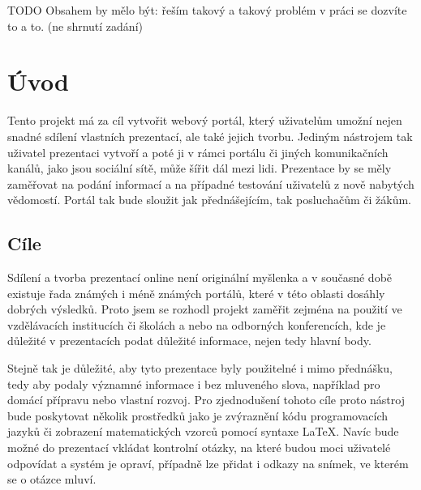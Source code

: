 \documentclass[11pt,twoside,a4paper]{book}
\begin{document}

	\baselineskip

	\noindent
	TODO Obsahem by mělo být: řeším takový a takový problém v práci se dozvíte to a to. (ne shrnutí zadání)

	\tableofcontents		%

	\listoffigures			%

	\mainbodystarts



\chapter{Úvod}
Tento projekt má za cíl vytvořit webový portál, který uživatelům umožní nejen snadné sdílení vlastních prezentací, ale také jejich tvorbu. Jediným nástrojem tak uživatel prezentaci vytvoří a poté ji v rámci portálu či jiných komunikačních kanálů, jako jsou sociální sítě, může šířit dál mezi lidi. Prezentace by se měly zaměřovat na podání informací a na případné testování uživatelů z nově nabytých vědomostí. Portál tak bude sloužit jak přednášejícím, tak posluchačům či žákům.

\section{Cíle}
Sdílení a tvorba prezentací online není originální myšlenka a v současné době existuje řada známých i méně známých portálů, které v této oblasti dosáhly dobrých výsledků. Proto jsem se rozhodl projekt zaměřit zejména na použití ve vzdělávacích institucích či školách a nebo na odborných konferencích, kde je důležité v prezentacích podat důležité informace, nejen tedy hlavní body.

Stejně tak je důležité, aby tyto prezentace byly použitelné i mimo přednášku, tedy aby podaly významné informace i bez mluveného slova, například pro domácí přípravu nebo vlastní rozvoj. Pro zjednodušení tohoto cíle proto nástroj bude poskytovat několik prostředků jako je zvýraznění kódu programovacích jazyků či zobrazení matematických vzorců pomocí syntaxe \LaTeX. Navíc bude možné do prezentací vkládat kontrolní otázky, na které budou moci uživatelé odpovídat a systém je opraví, případně lze přidat i odkazy na snímek, ve kterém se o otázce mluví.
\end{document}
